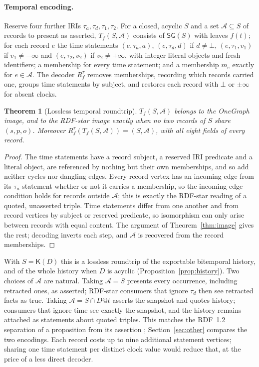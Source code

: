 \documentclass[11pt]{article}
\theoremstyle{plain}
\newtheorem{theorem}{Theorem}
\theoremstyle{definition}
\theoremstyle{remark}
\newcommand{\SG}{\mathsf{SG}}
\newcommand{\Kernel}{\mathsf{K}}
\begin{document}
\paragraph{Temporal encoding.}
Reserve four further IRIs $\tau_a,\tau_d,\tau_1,\tau_2$. For a closed, acyclic $S$
and a set $\mathcal A\subseteq S$ of records to present as asserted, $T_f(S,\mathcal A)$
consists of $\SG(S)$ with leaves $f(t)$; for each record $e$ the time statements
$(e,\tau_a,a)$, $(e,\tau_d,d)$ if $d\ne\bot$, $(e,\tau_1,v_1)$ if
$v_1\ne-\infty$ and $(e,\tau_2,v_2)$ if $v_2\ne+\infty$, with integer literal
objects and fresh identifiers; a membership for every time statement; and a
membership $m_e$ exactly for $e\in\mathcal A$. The decoder $R^\tau_f$ removes
memberships, recording which records carried one, groups time statements by
subject, and restores each record with $\bot$ or $\pm\infty$ for absent clocks.

\begin{theorem}[Lossless temporal roundtrip]\label{thm:temporal}
$T_f(S,\mathcal A)$ belongs to the OneGraph image, and to the RDF-star image exactly
when no two records of $S$ share $(s,p,o)$. Moreover
$R^\tau_f(T_f(S,\mathcal A))=(S,\mathcal A)$, with all eight fields of every record.
\end{theorem}
\begin{proof}
The time statements have a record subject, a reserved IRI predicate and a literal
object, are referenced by nothing but their own memberships, and so add neither
cycles nor dangling edges. Every record vertex has an incoming edge from its
$\tau_a$ statement whether or not it carries a membership, so the incoming-edge
condition holds for records outside $\mathcal A$; this is exactly the RDF-star
reading of a quoted, unasserted triple. Time statements differ from one another
and from record vertices by subject or reserved predicate, so isomorphism can only
arise between records with equal content. The argument of Theorem~\ref{thm:image}
gives the rest; decoding inverts each step, and $\mathcal A$ is recovered from the
record memberships.
\end{proof}

With $S=\Kernel(D)$ this is a lossless roundtrip of the exportable bitemporal
history, and of the whole history when $D$ is acyclic
(Proposition~\ref{prop:history}). Two choices of $\mathcal A$ are natural.
Taking $\mathcal A=S$ presents every occurrence, including retracted ones, as
asserted; RDF-star consumers that ignore $\tau_d$ then see retracted facts as true.
Taking $\mathcal A=S\cap D@t$ asserts the snapshot and quotes history; consumers
that ignore time see exactly the snapshot, and the history remains attached as
statements about quoted triples. This matches the RDF~1.2 separation of a
proposition from its assertion \cite{w3c2026rdf12concepts}; Section~\ref{sec:other}
compares the two encodings. Each record costs up to nine
additional statement vertices; sharing one time statement per distinct clock value
would reduce that, at the price of a less direct decoder.
\end{document}
